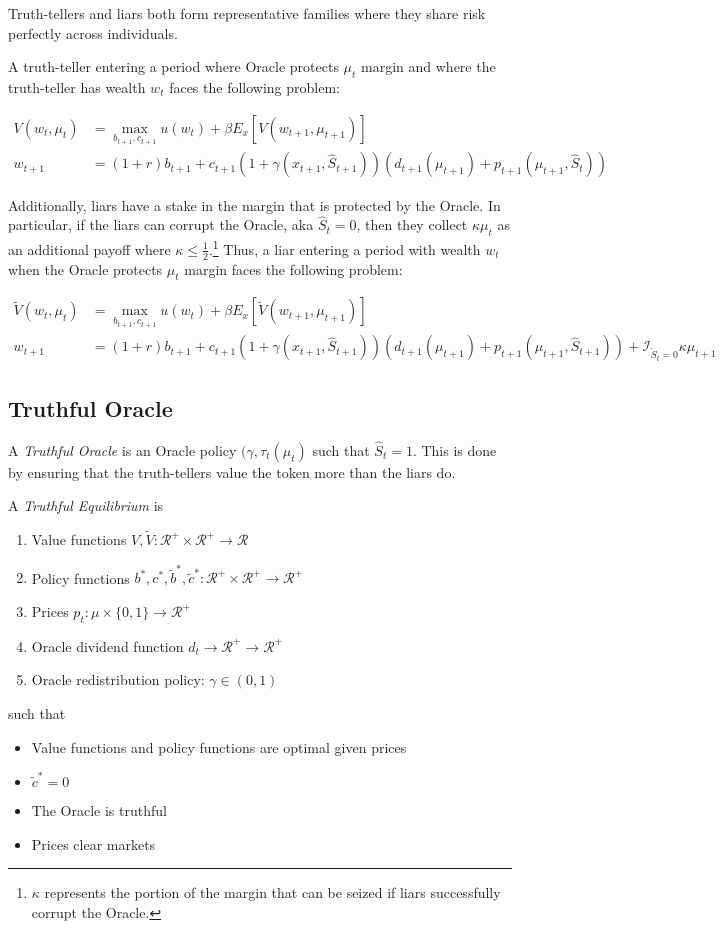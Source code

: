 \documentclass[12pt]{article}
\begin{document}
  Truth-tellers and liars both form representative families where they share risk perfectly across
  individuals.

  A truth-teller entering a period where Oracle protects $\mu_t$ margin and where the truth-teller
  has wealth $w_t$ faces the following problem:

  \begin{align}
    V(w_t, \mu_t) &= \max_{b_{t+1}, c_{t+1}} u(w_t) + \beta E_x \left[ V(w_{t+1}, \mu_{t+1}) \right] \\
    w_{t+1} &= (1 + r) b_{t+1} + c_{t+1} (1 + \gamma(x_{t+1}, \hat{S}_{t+1})) (d_{t+1}(\mu_{t+1}) + p_{t+1}(\mu_{t+1}, \hat{S}_t))
  \end{align}

  Additionally, liars have a stake in the margin that is protected by the Oracle. In particular, if
  the liars can corrupt the Oracle, aka $\hat{S}_t = 0$, then they collect $\kappa \mu_t$
  as an additional payoff where $\kappa \leq \frac{1}{2}$.\footnote{$\kappa$ represents the portion
  of the margin that can be seized if liars successfully corrupt the Oracle.} Thus, a liar entering
  a period with wealth $w_t$ when the Oracle protects $\mu_t$ margin faces the following problem:

  \begin{align}
    \tilde{V}(w_t, \mu_t) &= \max_{b_{t+1}, c_{t+1}} u(w_t) + \beta E_x \left[ \tilde{V}(w_{t+1}, \mu_{t+1}) \right] \\
    w_{t+1} &= (1 + r) b_{t+1} + c_{t+1} (1 + \gamma(x_{t+1}, \hat{S}_{t+1})) (d_{t+1}(\mu_{t+1}) + p_{t+1}(\mu_{t+1}, \hat{S}_{t+1})) + \mathcal{I}_{\tilde{S}_t = 0} \kappa \mu_{t+1}
  \end{align}


\subsection{Truthful Oracle}

  A \textit{Truthful Oracle} is an Oracle policy $(\gamma, \tau_t(\mu_t)$ such that $\hat{S}_t = 1$. This is done
  by ensuring that the truth-tellers value the token more than the liars do.

  A \textit{Truthful Equilibrium} is

  \begin{enumerate}
    \item Value functions $V, \tilde{V}: \mathcal{R}^+ \times \mathcal{R}^+ \rightarrow \mathcal{R}$
    \item Policy functions $b^*, c^*, \tilde{b}^*, \tilde{c}^*: \mathcal{R}^+ \times \mathcal{R}^+ \rightarrow \mathcal{R}^{+}$
    \item Prices $p_t : \mu \times \{0, 1\} \rightarrow \mathcal{R}^{+}$
    \item Oracle dividend function $d_t \rightarrow \mathcal{R}^{+} \rightarrow \mathcal{R}^+$
    \item Oracle redistribution policy: $\gamma \in (0, 1)$
  \end{enumerate}

  such that

  \begin{itemize}
    \item Value functions and policy functions are optimal given prices
    \item $\tilde{c}^* = 0$
    \item The Oracle is truthful
    \item Prices clear markets
  \end{itemize}
\end{document}

